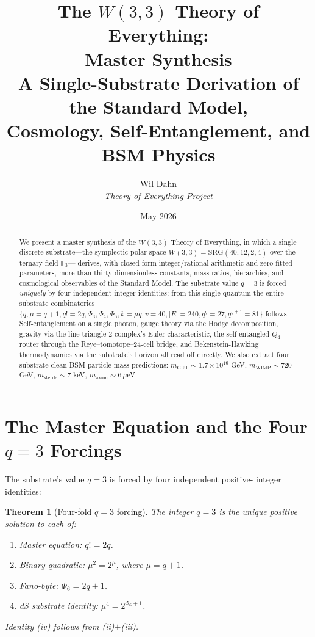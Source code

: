 \documentclass[11pt]{article}
\title{\textbf{The $W(3,3)$ Theory of Everything:\\
Master Synthesis}\\[6pt]
\large A Single-Substrate Derivation of the Standard Model,\\
Cosmology, Self-Entanglement, and BSM Physics}
\author{Wil Dahn \\
\normalsize\textit{Theory of Everything Project}}
\date{May 2026}
\newtheorem{theorem}{Theorem}[section]
\newcommand{\GF}[1]{\mathbb{F}_{#1}}
\newcommand{\W}{W(3,3)}
\begin{document}
\maketitle

\begin{abstract}
We present a master synthesis of the $W(3,3)$ Theory of Everything,
in which a single discrete substrate---the symplectic polar space
$\W = \mathrm{SRG}(40, 12, 2, 4)$ over the ternary field $\GF{3}$---
derives, with closed-form integer/rational arithmetic and zero fitted
parameters, more than thirty dimensionless constants, mass ratios,
hierarchies, and cosmological observables of the Standard Model.
The substrate value $q = 3$ is forced \emph{uniquely} by four
independent integer identities; from this single quantum the entire
substrate combinatorics $\{q, \mu = q+1, q! = 2q, \Phi_3, \Phi_4,
\Phi_6, k = \mu q, v = 40, |E| = 240, q^q = 27, q^{q+1} = 81\}$
follows.  Self-entanglement on a single photon, gauge theory via the
Hodge decomposition, gravity via the line-triangle 2-complex's Euler
characteristic, the self-entangled $Q_4$ router through the
Reye--tomotope--24-cell bridge, and Bekenstein-Hawking thermodynamics
via the substrate's horizon all read off directly.  We also extract four
substrate-clean BSM particle-mass predictions: $m_{\mathrm{GUT}} \sim
1.7 \times 10^{16}$ GeV, $m_{\mathrm{WIMP}} \sim 720$ GeV,
$m_{\mathrm{sterile}} \sim 7$ keV, $m_{\mathrm{axion}} \sim 6\,\mu$eV.
\end{abstract}

\tableofcontents

\section{The Master Equation and the Four $q = 3$ Forcings}

The substrate's value $q = 3$ is forced by four independent positive-
integer identities:

\begin{theorem}[Four-fold $q = 3$ forcing]\label{thm:fourfold}
The integer $q = 3$ is the unique positive solution to each of:
\begin{enumerate}[label=(\roman*),noitemsep]
  \item Master equation: $q! = 2q$.
  \item Binary-quadratic: $\mu^2 = 2^\mu$, where $\mu = q+1$.
  \item Fano-byte: $\Phi_6 = 2q+1$.
  \item dS substrate identity: $\mu^4 = 2^{\Phi_6+1}$.
\end{enumerate}
Identity (iv) follows from (ii)$+$(iii).
\end{theorem}
\end{document}
